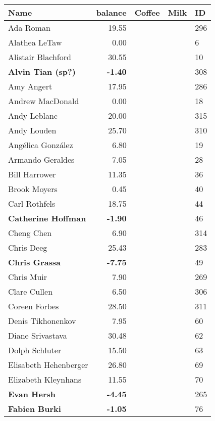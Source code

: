 \begin{longtable}{|p{5cm}|r|p{9cm}|p{6cm}|l|}
 Name & balance & \textbf{Coffee} & \textbf{Milk} & ID \\ 
  \hline \endhead Ada Roman & 19.55 &  &  & 296 \\ 
   \hline
Alathea LeTaw & 0.00 &  &  &   6 \\ 
   \hline
Alistair Blachford & 30.55 &  &  &  10 \\ 
   \hline
\textbf{Alvin Tian (sp?)} & \textbf{-1.40} &  &  & 308 \\ 
   \hline
Amy Angert & 17.95 &  &  & 286 \\ 
   \hline
Andrew MacDonald & 0.00 &  &  &  18 \\ 
   \hline
Andy Leblanc & 20.00 &  &  & 315 \\ 
   \hline
Andy Louden & 25.70 &  &  & 310 \\ 
   \hline
Ang\'elica Gonz\'alez & 6.80 &  &  &  19 \\ 
   \hline
Armando Geraldes & 7.05 &  &  &  28 \\ 
   \hline
Bill Harrower & 11.35 &  &  &  36 \\ 
   \hline
Brook Moyers & 0.45 &  &  &  40 \\ 
   \hline
Carl Rothfels & 18.75 &  &  &  44 \\ 
   \hline
\textbf{Catherine Hoffman} & \textbf{-1.90} &  &  &  46 \\ 
   \hline
Cheng Chen & 6.90 &  &  & 314 \\ 
   \hline
Chris Deeg & 25.43 &  &  & 283 \\ 
   \hline
\textbf{Chris Grassa} & \textbf{-7.75} &  &  &  49 \\ 
   \hline
Chris Muir & 7.90 &  &  & 269 \\ 
   \hline
Clare Cullen & 6.50 &  &  & 306 \\ 
   \hline
Coreen Forbes & 28.50 &  &  & 311 \\ 
   \hline
Denis Tikhonenkov & 7.95 &  &  &  60 \\ 
   \hline
Diane Srivastava & 30.48 &  &  &  62 \\ 
   \hline
Dolph Schluter & 15.50 &  &  &  63 \\ 
   \hline
Elisabeth Hehenberger & 26.80 &  &  &  69 \\ 
   \hline
Elizabeth Kleynhans & 11.55 &  &  &  70 \\ 
   \hline
\textbf{Evan Hersh} & \textbf{-4.45} &  &  & 265 \\ 
   \hline
\textbf{Fabien Burki} & \textbf{-1.05} &  &  &  76 \\ 

\end{longtable}
